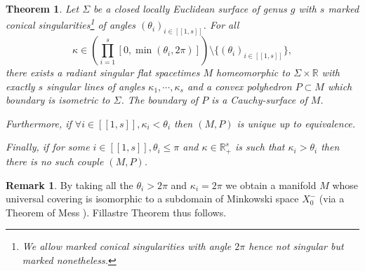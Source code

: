 \documentclass[a4paper,12pt]{article}
\def\lsem{[\![}
\def\rsem{]\!]}
\def\RR{\mathbb{R}}
\newtheorem*{theon}{Theorem}
\theoremstyle{definition}
\newtheorem*{rem}{Remark}			 %
\begin{document}
	 \begin{theon}\label{theo:closed_locally_euclidean_surface} Let $\Sigma$ be a closed locally Euclidean surface of genus $g$ with $s$ marked conical singularities\footnote{We allow marked conical singularities with angle $2\pi$ hence not singular but marked nonetheless.}  of angles $(\theta_i)_{i\in \lsem 1,s\rsem}$.
For all $$\kappa\in \left(\prod_{i=1}^s[0,\min(\theta_i,2\pi)]\right) \setminus \{(\theta_i)_{i\in \lsem 1,s\rsem}\},$$ there exists a radiant singular flat spacetimes $M$ homeomorphic to $\Sigma\times \RR$ with exactly $s$ singular lines of angles $\kappa_1,\cdots,\kappa_s$ and
a convex polyhedron $P\subset M$ which boundary is isometric to $\Sigma$. The boundary of $P$ is a Cauchy-surface of $M$.
	
	Furthermore, if $\forall i\in\lsem 1,s\rsem,\kappa_i<\theta_i$ then $(M,P)$ is unique up to equivalence.
				
	Finally, if for some $i\in\lsem 1,s\rsem,\theta_i\leq \pi$ and $\kappa\in \RR_+^s$ is such that $\kappa_i>\theta_i$ then there is no such couple $(M,P)$.
	\end{theon}
	\begin{rem}\label{rem:taking_all_obtain_manifold}
	By taking all the $\theta_i>2\pi$ and $\kappa_i=2\pi$ we obtain a manifold $M$ whose universal covering is isomorphic to a subdomain of Minkowski space $X_{0}^-$ (via a Theorem of Mess \cite{mess}). Fillastre Theorem thus follows.
	\end{rem}


	
	
	
\end{document}
